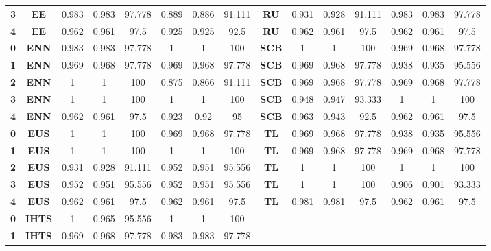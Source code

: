 {{\begin{tabular}{c|c|cccccc|ccccccc}
\textbf{3} & \textbf{EE} & 0.983 & 0.983 & 97.778 & 0.889 & 0.886 & 91.111 & \multicolumn{1}{c|}{\textbf{RU}} & 0.931 & 0.928 & 91.111 & 0.983 & 0.983 & 97.778 \\
\textbf{4} & \textbf{EE} & 0.962 & 0.961 & 97.5  & 0.925 & 0.925 & 92.5  & \multicolumn{1}{c|}{\textbf{RU}} & 0.962 & 0.961 & 97.5  & 0.962 & 0.961 & 97.5 \\
\textbf{0} & \textbf{ENN} & 0.983 & 0.983 & 97.778 & 1     & 1     & 100   & \multicolumn{1}{c|}{\textbf{SCB}} & 1     & 1     & 100   & 0.969 & 0.968 & 97.778 \\
\textbf{1} & \textbf{ENN} & 0.969 & 0.968 & 97.778 & 0.969 & 0.968 & 97.778 & \multicolumn{1}{c|}{\textbf{SCB}} & 0.969 & 0.968 & 97.778 & 0.938 & 0.935 & 95.556 \\
\textbf{2} & \textbf{ENN} & 1     & 1     & 100   & 0.875 & 0.866 & 91.111 & \multicolumn{1}{c|}{\textbf{SCB}} & 0.969 & 0.968 & 97.778 & 0.969 & 0.968 & 97.778 \\
\textbf{3} & \textbf{ENN} & 1     & 1     & 100   & 1     & 1     & 100   & \multicolumn{1}{c|}{\textbf{SCB}} & 0.948 & 0.947 & 93.333 & 1     & 1     & 100 \\
\textbf{4} & \textbf{ENN} & 0.962 & 0.961 & 97.5  & 0.923 & 0.92  & 95    & \multicolumn{1}{c|}{\textbf{SCB}} & 0.963 & 0.943 & 92.5  & 0.962 & 0.961 & 97.5 \\
\textbf{0} & \textbf{EUS} & 1     & 1     & 100   & 0.969 & 0.968 & 97.778 & \multicolumn{1}{c|}{\textbf{TL}} & 0.969 & 0.968 & 97.778 & 0.938 & 0.935 & 95.556 \\
\textbf{1} & \textbf{EUS} & 1     & 1     & 100   & 1     & 1     & 100   & \multicolumn{1}{c|}{\textbf{TL}} & 0.969 & 0.968 & 97.778 & 0.969 & 0.968 & 97.778 \\
\textbf{2} & \textbf{EUS} & 0.931 & 0.928 & 91.111 & 0.952 & 0.951 & 95.556 & \multicolumn{1}{c|}{\textbf{TL}} & 1     & 1     & 100   & 1     & 1     & 100 \\
\textbf{3} & \textbf{EUS} & 0.952 & 0.951 & 95.556 & 0.952 & 0.951 & 95.556 & \multicolumn{1}{c|}{\textbf{TL}} & 1     & 1     & 100   & 0.906 & 0.901 & 93.333 \\
\textbf{4} & \textbf{EUS} & 0.962 & 0.961 & 97.5  & 0.962 & 0.961 & 97.5  & \multicolumn{1}{c|}{\textbf{TL}} & 0.981 & 0.981 & 97.5  & 0.962 & 0.961 & 97.5 \\
\textbf{0} & \textbf{IHTS} & 1     & 0.965 & 95.556 & 1     & 1     & 100   &       &       &       &       &       &       &  \\
\textbf{1} & \textbf{IHTS} & 0.969 & 0.968 & 97.778 & 0.983 & 0.983 & 97.778 &       &       &       &       &       &       &  \\

\end{tabular}}}
